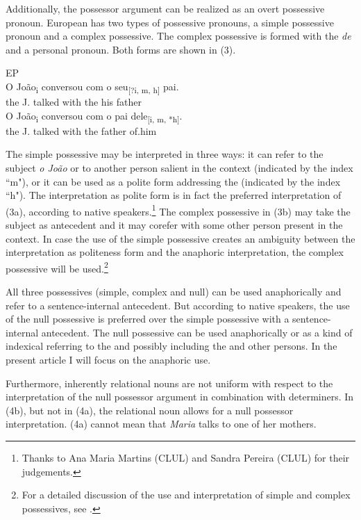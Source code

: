 \documentclass[output=paper]{langsci/langscibook}
\begin{document}
Additionally, the possessor argument can be realized as an overt possessive pronoun. European  has two types of possessive pronouns, a simple possessive pronoun and a complex possessive. The complex possessive is formed with the  \textit{de} and a personal pronoun. Both forms are shown in (3).

\ea%
    EP\label{ex:wein:3}\\
    \ea
    \gll O João\textsubscript{i} conversou com o seu\textsubscript{[?i, m, h]} pai.  \\
         the J. talked with the his father\\
    \ex
    \gll O João\textsubscript{i} conversou com o   pai   dele\textsubscript{[i, m, *h]}.\\
         the J. talked with the father of.him\\
    \z
\z

The simple possessive may be interpreted in three ways: it can refer to the subject \textit{o João} or to another person salient in the context (indicated by the index “m"), or it can be used as a polite form addressing the  (indicated by the index “h"). The interpretation as polite form is in fact the preferred interpretation of (3a), according to native speakers.\footnote{Thanks to Ana Maria Martins (CLUL) and Sandra Pereira (CLUL) for their judgements.} The complex possessive in (3b) may take the subject as antecedent and it may corefer with some other person present in the context. In case the use of the simple possessive creates an ambiguity between the interpretation as politeness form and the anaphoric interpretation, the complex possessive will be used.\footnote{For a detailed discussion of the use and interpretation of simple and complex possessives, see \citet{Castro2005}.}

All three possessives (simple, complex and null) can be used anaphorically and refer to a sentence-internal antecedent. But according to native speakers, the use of the null possessive is preferred over the simple possessive with a sentence-internal antecedent. The null possessive can be used anaphorically or as a kind of indexical referring to the  and possibly including the  and other persons. In the present article I will focus on the anaphoric use.

Furthermore, inherently relational nouns are not uniform with respect to the interpretation of the null possessor argument in combination with  determiners. In (4b), but not in (4a), the relational noun allows for a null possessor interpretation. (4a) cannot mean that \textit{Maria} talks to one of her mothers.
\end{document}
